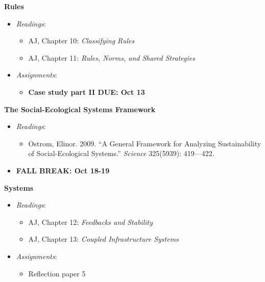 \week \textbf{Rules}

\begin{itemize}

\item
  \emph{Readings}:

  \begin{itemize}
  
  \item
    AJ, Chapter 10: \emph{Classifying Rules}
  \item
    AJ, Chapter 11: \emph{Rules, Norms, and Shared Strategies}
  \end{itemize}
\item
  \emph{Assignments}:

  \begin{itemize}
  
  \item
    \textbf{Case study part II DUE: Oct 13}
  \end{itemize}
\end{itemize}

\week \textbf{The Social-Ecological Systems Framework}

\begin{itemize}

\item
  \emph{Readings}:

  \begin{itemize}
  
  \item
    Ostrom, Elinor. 2009. ``A General Framework for Analyzing
    Sustainability of Social-Ecological Systems.'' \emph{Science}
    325(5939): 419---422.
  \end{itemize}
\item
  \textbf{FALL BREAK: Oct 18-19}
\end{itemize}

\week \textbf{Systems}

\begin{itemize}

\item
  \emph{Readings}:

  \begin{itemize}
  
  \item
    AJ, Chapter 12: \emph{Feedbacks and Stability}
  \item
    AJ, Chapter 13: \emph{Coupled Infrastructure Systems}
  \end{itemize}
\item
  \emph{Assignments}:

  \begin{itemize}
  
  \item
    Reflection paper 5
  \end{itemize}
\end{itemize}

